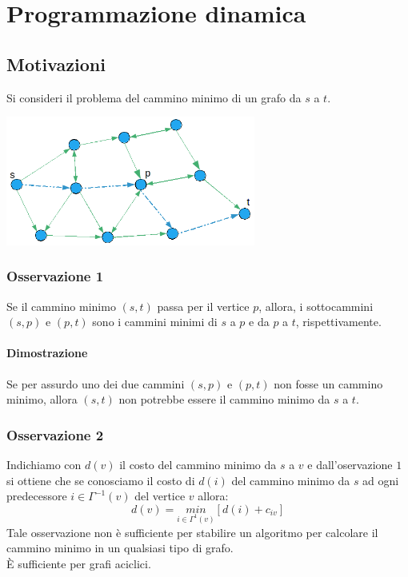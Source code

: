 \chapter{Programmazione dinamica}
\section{Motivazioni}
Si consideri il problema del cammino minimo di un grafo da $s$ a $t$.\\
\centerline{\includegraphics[height=4.25cm]{images/graph37.png}}
\subsection{Osservazione 1}
Se il cammino minimo $(s,t)$ passa per il vertice $p$, allora, i sottocammini $(s,p)$ e $(p,t)$ sono i cammini minimi di $s$ a $p$ e da $p$ a $t$, rispettivamente.
\subsubsection{Dimostrazione}
Se per assurdo uno dei due cammini $(s,p)$ e $(p,t)$ non fosse un cammino minimo, allora $(s,t)$ non potrebbe essere il cammino minimo da $s$ a $t$.
\subsection{Osservazione 2}
Indichiamo con $d(v)$ il costo del cammino minimo da $s$ a $v$ e dall'oservazione $1$ si ottiene che se conosciamo il costo di $d(i)$ del cammino minimo da $s$ ad ogni predecessore $i\in \Gamma^{-1}(v)$ del vertice $v$ allora:
\begin{equation}
	d(v)=\underset{i\in\Gamma^{1}(v)}{min}[d(i)+c_{iv}] \label{eq:4.1}
\end{equation}
Tale osservazione non è sufficiente per stabilire un algoritmo per calcolare il cammino minimo in un qualsiasi tipo di grafo.\\
È sufficiente per grafi aciclici.

